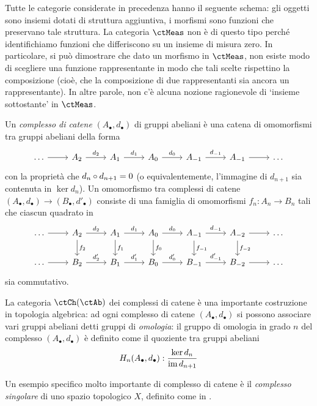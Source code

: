 Tutte le categorie considerate in precedenza hanno il seguente schema: gli oggetti sono insiemi dotati di struttura aggiuntiva, i morfismi sono funzioni che preservano tale struttura. La categoria \(\ctMeas\) non è di questo tipo perché identifichiamo funzioni che differiscono su un insieme di misura zero. In particolare, si può dimostrare che dato un morfismo in \(\ctMeas\), non esiste modo di scegliere una funzione rappresentante in modo che tali scelte rispettino la composizione (cioè, che la composizione di due rappresentanti sia ancora un rappresentante). In altre parole, non c’è alcuna nozione ragionevole di `insieme sottostante' in \(\ctMeas\).
\begin{example}\label{ex_cat_chcomples}
	Un \emph{complesso di catene} \((A_\bullet, d_\bullet)\) di gruppi abeliani è una catena di omomorfismi tra gruppi abeliani della forma
	\[\begin{tikzcd}
			\dots \ar[r] & A_2 \ar[r, "d_2"] & A_1  \ar[r, "d_1"] & A_0 \ar[r, "d_0"] & A_{-1} \ar[r, "d_{-1}"] & A_{-1} \ar[r] & \dots
		\end{tikzcd}\]
	con la proprietà che \(d_n\circ d_{n+1}=0\) (o equivalentemente, l'immagine di \(d_{n+1}\) sia contenuta in \(\ker d_n\)). Un omomorfismo tra complessi di catene \((A_\bullet,d_\bullet) \to (B_\bullet,d'_\bullet)\) consiste di una famiglia di omomorfismi \(f_n : A_n \to B_n\) tali che ciascun quadrato in
	\[\begin{tikzcd}
			\dots \ar[r] & A_2 \ar[d,"f_2"]\ar[r, "d_2"] & A_1 \ar[d,"f_1"] \ar[r, "d_1"] & A_0 \ar[d,"f_0"]\ar[r, "d_0"] & A_{-1} \ar[d,"f_{-1}"]\ar[r, "d_{-1}"] & A_{-2} \ar[d, "f_{-2}"]\ar[r] & \dots\\
			\dots \ar[r] & B_2 \ar[r, "d_2'"] & B_1  \ar[r, "d_1'"] & B_0 \ar[r, "d_0'"] & B_{-1} \ar[r, "d_{-1}'"] & B_{-2} \ar[r] & \dots
		\end{tikzcd}\]
	sia commutativo.

	La categoria \(\ctCh(\ctAb)\) dei complessi di catene è una importante costruzione in topologia algebrica: ad ogni complesso di catene \((A_\bullet, d_\bullet)\) si possono associare vari gruppi abeliani detti gruppi di \emph{omologia}: il gruppo di omologia in grado \(n\) del complesso \((A_\bullet, d_\bullet)\) è definito come il quoziente tra gruppi abeliani
	\[H_n(A_\bullet, d_\bullet) : \frac{\ker d_n}{\operatorname{im} d_{n+1}}\]

	Un esempio specifico molto importante di complesso di catene è il \emph{complesso singolare} di uno spazio topologico \(X\), definito come in \cite[Cap. 1]{Vick73a}.
\end{example}
